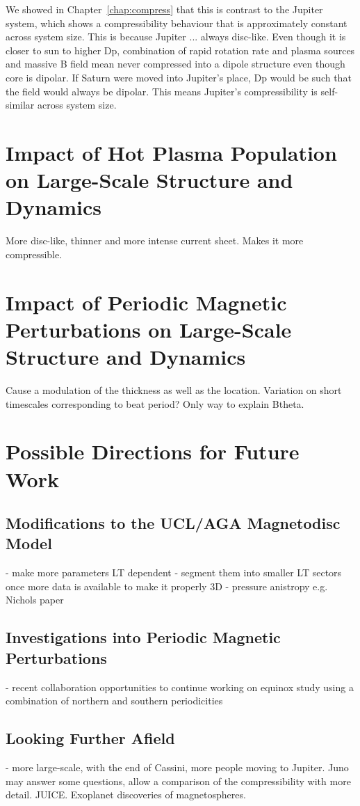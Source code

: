 We showed in Chapter~\ref{chap:compress} that this is contrast to the Jupiter system, which shows a compressibility behaviour that is approximately constant across system size. This is because Jupiter ... always disc-like. Even though it is closer to sun to higher Dp, combination of rapid rotation rate and plasma sources and massive B field mean never  compressed into a dipole structure even though core is dipolar. If Saturn were moved into Jupiter's place, Dp would be such that the field would always be dipolar. This means Jupiter's compressibility is self-similar across system size.

\section{Impact of Hot Plasma Population on Large-Scale Structure and Dynamics}
More disc-like, thinner and more intense current sheet. Makes it more compressible.

\section{Impact of Periodic Magnetic Perturbations on Large-Scale Structure and Dynamics}
Cause a modulation of the thickness as well as the location. Variation on short timescales corresponding to beat period? Only way to explain Btheta.

\section{Possible Directions for Future Work}
\subsection{Modifications to the UCL/AGA Magnetodisc Model}
- make more parameters LT dependent
- segment them into  smaller LT sectors once more data  is available to make it properly 3D
- pressure anistropy e.g. Nichols paper

\subsection{Investigations into Periodic Magnetic Perturbations}
- recent collaboration opportunities to continue working on equinox study using a combination of northern and southern periodicities

\subsection{Looking Further Afield}
- more large-scale, with the end of Cassini, more  people moving  to Jupiter. Juno may answer some questions, allow a comparison of the compressibility with more detail. JUICE.
Exoplanet discoveries of magnetospheres.